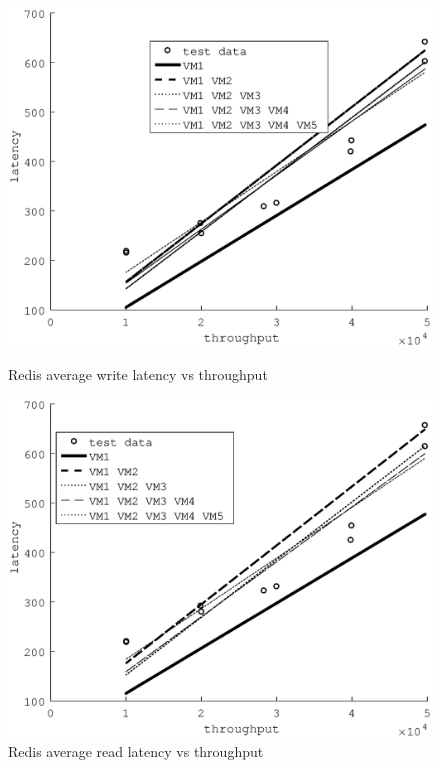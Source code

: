 \documentclass{acm_proc_article-sp}
\begin{document}
  \begin{figure}
\centering
\begin{minipage}{.25\textwidth}
  \centering
    \includegraphics[scale = 0.25]{fit_write_avg_latency_r3_2x_r3__m3_2x_m3__r3_x_m3_x.eps}
    \caption{Redis average write latency vs throughput}
    \label{figure:redisbarread}
\end{minipage}%
\begin{minipage}{.25\textwidth}
  \centering
    \includegraphics[scale = 0.25]{fit_read_avg_latency_r3_2x_r3__m3_2x_m3__r3_x_m3_x.eps}
    \caption{Redis average read latency vs throughput}
  \label{fig:redisbarread}
\end{minipage}
  \end{figure}
\end{document}
